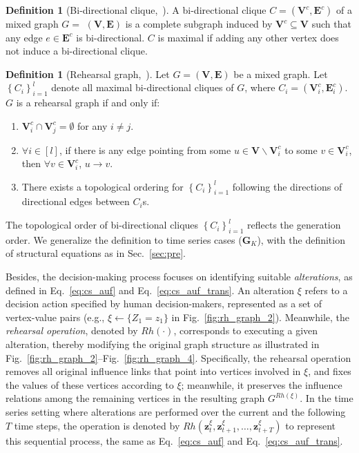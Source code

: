\documentclass{article}
\theoremstyle{plain}
\theoremstyle{definition}
\newtheorem{definition}[theorem]{Definition}
\theoremstyle{remark}
\def \Fig {Fig.}
\def \Eq {Eq.}
\def \E {\mathbf{E}}
\def \V {\mathbf{V}}
\def \G {\mathbf{G}}
\def \V {\mathbf{V}}
\def \z {\mathbf{z}}
\begin{document}
\begin{definition}[Bi-directional clique,~\cite{qint2023srm}]
  \label{def:bi_clique}
  A bi-directional clique $C=\left(\V^c, \E^c\right)$ of a mixed graph $G=$ $(\V, \E)$ is a complete subgraph induced by $\V^c \subseteq \V$ such that any edge $e \in \E^c$ is bi-directional. $C$ is maximal if adding any other vertex does not induce a bi-directional clique.
\end{definition}

\begin{definition}[Rehearsal graph,~\cite{qint2023srm}]
  \label{def:rh_graph}
  Let $G=(\V, \E)$ be a mixed graph. Let $\left\{C_i\right\}_{i=1}^l$ denote all maximal bi-directional cliques of $G$, where $C_i=\left(\V_i^c, \E_i^c\right)$. $G$ is a rehearsal graph if and only if:
  \vspace{-0.07in}
  \begin{enumerate}[leftmargin=12pt, itemsep=-0.05in]
    \item $\V_i^c \cap \V_j^c=\emptyset$ for any $i \neq j$.
    \item $\forall i \in[l]$, if there is any edge pointing from some $u \in \V \backslash \V_i^c$ to some $v \in \V_i^c$, then $\forall v \in \V_i^c$, $u \rightarrow v$.
    \item There exists a topological ordering for $\left\{C_i\right\}_{i=1}^l$ following the directions of directional edges between $C_i$s.
    \vspace{-.6\baselineskip}
  \end{enumerate}
\end{definition}

The topological order of bi-directional cliques $\left\{C_i\right\}_{i=1}^l$ reflects the generation order. 
We generalize the definition to time series cases (\(\G_K\)), with the definition of structural equations as in Sec.~\ref{sec:pre}. 




Besides, the decision-making process focuses on identifying suitable \textit{alterations}, as defined in \Eq~\eqref{eq:cs_auf} and \Eq~\eqref{eq:cs_auf_trans}. 
An alteration $\xi$ refers to a decision action specified by human decision-makers, represented as a set of vertex-value pairs (e.g., $\xi \leftarrow \{Z_1 = z_1\}$ in \Fig~\ref{fig:rh_graph_2}). 
Meanwhile, the \textit{rehearsal operation}, denoted by $Rh(\cdot)$, corresponds to executing a given alteration, thereby modifying the original graph structure as illustrated in \Fig~\ref{fig:rh_graph_2}--\Fig~\ref{fig:rh_graph_4}. 
Specifically, the rehearsal operation removes all original influence links that point into vertices involved in $\xi$, and fixes the values of these vertices according to $\xi$;
meanwhile, it preserves the influence relations among the remaining vertices in the resulting graph $G^{Rh(\xi)}$. 
In the time series setting where alterations are performed over the current and the following \(T\) time steps, the operation is denoted by \(Rh(\z_t^\xi, \z_{t+1}^\xi, \ldots, \z_{t+T}^\xi)\) to represent this sequential process, the same as \Eq~\eqref{eq:cs_auf} and \Eq~\eqref{eq:cs_auf_trans}.
\end{document}
